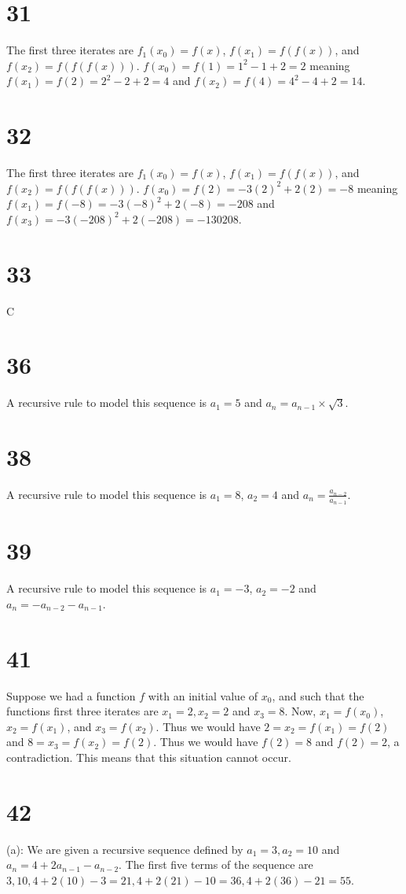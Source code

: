 \documentclass{article}
\theoremstyle{definition}
\newcommand{\?}{\stackrel{?}{=}}
\begin{document}
\section*{31}
The first three iterates are $f_1(x_0)=f(x)$, $f(x_1)=f(f(x))$, and $f(x_2)=f(f(f(x)))$. $f(x_0)=f(1)=1^2-1+2=2$ meaning
$f(x_1)=f(2)=2^2-2+2=4$ and $f(x_2)=f(4)=4^2-4+2=14$.

\section*{32}
The first three iterates are $f_1(x_0)=f(x)$, $f(x_1)=f(f(x))$, and $f(x_2)=f(f(f(x)))$. $f(x_0)=f(2)=-3(2)^2+2(2)=-8$ meaning
$f(x_1)=f(-8)=-3(-8)^2+2(-8)=-208$ and $f(x_3)=-3(-208)^2+2(-208)=-130208$.

\section*{33}
C

\section*{36}
A recursive rule to model this sequence is $a_1=5$ and $a_n=a_{n-1}\times\sqrt{3}$.

\section*{38}
A recursive rule to model this sequence is $a_1=8$, $a_2=4$ and $a_n=\frac{a_{n-2}}{a_{n-1}}$.

\section*{39}
A recursive rule to model this sequence is $a_1=-3$, $a_2=-2$ and $a_n=-a_{n-2}-a_{n-1}$.

\section*{41}
Suppose we had a function $f$ with an initial value of $x_0$, and such that the functions first three iterates are $x_1=2,x_2=2$ and $x_3=8$. 
Now, $x_1=f(x_0)$, $x_2=f(x_1)$, and $x_3=f(x_2)$. Thus we would have $2=x_2=f(x_1)=f(2)$ and $8=x_3=f(x_2)=f(2)$. Thus we would have $f(2)=8$ and $f(2)=2$, a
contradiction. This means that this situation cannot occur.

\section*{42}
(a): We are given a recursive sequence defined by $a_1=3,a_2=10$ and $a_n=4+2a_{n-1}-a_{n-2}$. The first five terms of the sequence are
$3,10,4+2(10)-3=21,4+2(21)-10=36,4+2(36)-21=55$.
\end{document}
